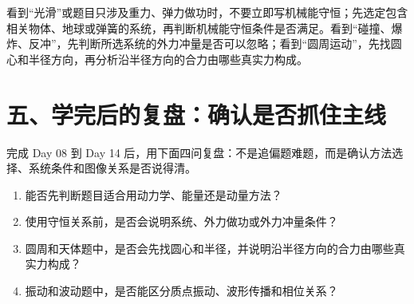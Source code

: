 看到“光滑”或题目只涉及重力、弹力做功时，不要立即写机械能守恒；先选定包含相关物体、地球或弹簧的系统，再判断机械能守恒条件是否满足。看到“碰撞、爆炸、反冲”，先判断所选系统的外力冲量是否可以忽略；看到“圆周运动”，先找圆心和半径方向，再分析沿半径方向的合力由哪些真实力构成。

\section*{五、学完后的复盘：确认是否抓住主线}

完成 Day 08 到 Day 14 后，用下面四问复盘：不是追偏题难题，而是确认方法选择、系统条件和图像关系是否说得清。
\begin{enumerate}[itemsep=0.2em]
  \item 能否先判断题目适合用动力学、能量还是动量方法？
  \item 使用守恒关系前，是否会说明系统、外力做功或外力冲量条件？
  \item 圆周和天体题中，是否会先找圆心和半径，并说明沿半径方向的合力由哪些真实力构成？
  \item 振动和波动题中，是否能区分质点振动、波形传播和相位关系？
\end{enumerate}
